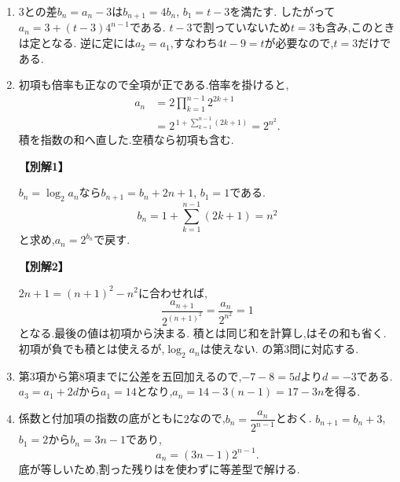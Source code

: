 \begin{enumerate}[label=\textbf{問\arabic*.},leftmargin=3.8em,format=\bookitemlink{practice-basic}{solution}{problem}]
          \item {}$3$との差$b_n=a_n-3$は$b_{n+1}=4b_n$, $b_1=t-3$を満たす.
                  したがって$a_n=3+(t-3)4^{n-1}$である.
                  $t-3$で割っていないため$t=3$も含み,このときは定となる.
                  逆に定には$a_2=a_1$,すなわち$4t-9=t$が必要なので,$t=3$だけである.

          \item 初項も倍率も正なので全項が正である.倍率を掛けると,
                  \[
                    \begin{aligned}
                    a_n&=2\prod_{k=1}^{n-1}2^{2k+1}\\
                       &=2^{\,1+\sum_{k=1}^{n-1}(2k+1)}=2^{n^2}.
                    \end{aligned}
                  \]
                  積を指数の和へ直した.空積なら初項も含む.
                  \par\smallskip\noindent\textbf{【別解1】}\par
                  $b_n=\log_2a_n$なら$b_{n+1}=b_n+2n+1$, $b_1=1$である.
                  \[
                    b_n=1+\sum_{k=1}^{n-1}(2k+1)=n^2
                  \]
                  と求め,$a_n=2^{b_n}$で戻す.
                  \par\smallskip\noindent\textbf{【別解2】}\par
                  $2n+1=(n+1)^2-n^2$に合わせれば,
                  \[
                    \frac{a_{n+1}}{2^{(n+1)^2}}=\frac{a_n}{2^{n^2}}=1
                  \]
                  となる.最後の値は初項から決まる.
                  積とは同じ和を計算し,はその和も省く.
                  初項が負でも積とは使えるが,$\log_2a_n$は使えない.
                  の第3問に対応する.

          \item 第3項から第8項までに公差を五回加えるので,$-7-8=5d$より$d=-3$である.
                  $a_3=a_1+2d$から$a_1=14$となり,$a_n=14-3(n-1)=17-3n$を得る.

          \item 係数と付加項の指数の底がともに$2$なので,$b_n=\dfrac{a_n}{2^{n-1}}$とおく.
                  $b_{n+1}=b_n+3$, $b_1=2$から$b_n=3n-1$であり,
                  \[
                    a_n=(3n-1)2^{n-1}.
                  \]
                  底が等しいため,割った残りはを使わずに等差型で解ける.


\end{enumerate}

